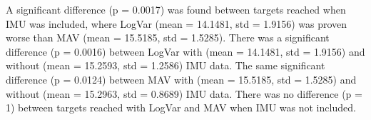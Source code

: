 	A significant difference (p = 0.0017) was found between targets reached when IMU was included, where LogVar (mean = 14.1481, std = 1.9156) was proven worse than MAV (mean = 15.5185, std = 1.5285). There was a significant difference (p = 0.0016) between LogVar with (mean = 14.1481, std = 1.9156) and without (mean = 15.2593, std = 1.2586) IMU data. The same significant difference (p = 0.0124) between MAV with (mean = 15.5185, std = 1.5285) and without (mean = 15.2963, std = 0.8689) IMU data. There was no difference (p = 1) between targets reached with LogVar and MAV when IMU was not included.
	
	
	
	
	
	
	
	
	
	
